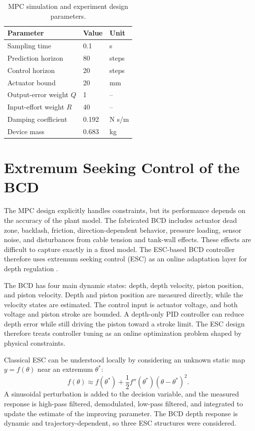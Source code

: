 \documentclass{uhcoethesis}
\begin{document}
\begin{table}[t]
    \centering
    \caption{MPC simulation and experiment design parameters.}
    \label{tab:ch3_mpc_parameters}
    \begin{tabular}{lll}
        \hline
        Parameter & Value & Unit \\
        \hline
        Sampling time & 0.1 & s \\
        Prediction horizon & 80 & steps \\
        Control horizon & 20 & steps \\
        Actuator bound & 20 & mm \\
        Output-error weight $Q$ & 1 & -- \\
        Input-effort weight $R$ & 40 & -- \\
        Damping coefficient & 0.192 & N s/m \\
        Device mass & 0.683 & kg \\
        \hline
    \end{tabular}
\end{table}

\section{Extremum Seeking Control of the BCD}

The MPC design explicitly handles constraints, but its performance depends on the accuracy of the plant model. The fabricated BCD includes actuator dead zone, backlash, friction, direction-dependent behavior, pressure loading, sensor noise, and disturbances from cable tension and tank-wall effects. These effects are difficult to capture exactly in a fixed model. The ESC-based BCD controller therefore uses extremum seeking control (ESC) as an online adaptation layer for depth regulation \cite{Masood2026ESCBCD}.

The BCD has four main dynamic states: depth, depth velocity, piston position, and piston velocity. Depth and piston position are measured directly, while the velocity states are estimated. The control input is actuator voltage, and both voltage and piston stroke are bounded. A depth-only PID controller can reduce depth error while still driving the piston toward a stroke limit. The ESC design therefore treats controller tuning as an online optimization problem shaped by physical constraints.

Classical ESC can be understood locally by considering an unknown static map $y=f(\theta)$ near an extremum $\theta^\ast$:
\begin{equation}
    f(\theta)
    \approx
    f(\theta^\ast)
    + \frac{1}{2}f''(\theta^\ast)(\theta-\theta^\ast)^2 .
    \label{eq:ch3_esc_static_map}
\end{equation}
A sinusoidal perturbation is added to the decision variable, and the measured response is high-pass filtered, demodulated, low-pass filtered, and integrated to update the estimate of the improving parameter. The BCD depth response is dynamic and trajectory-dependent, so three ESC structures were considered.
\end{document}
